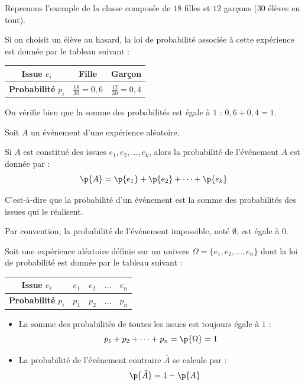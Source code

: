 \begin{ex}
	Reprenons l'exemple de la classe composée de $18$ filles et $12$ garçons ($30$ élèves en tout).

	Si on choisit un élève au hasard, la loi de probabilité associée à cette expérience est donnée par le tableau suivant :

	\begin{center}
		\begin{tabular}{|c|c|c|} \hline
			\textbf{Issue} $e_i$       & Fille                   & Garçon                  \\ \hline
			\textbf{Probabilité} $p_i$ & $\frac{18}{30} = 0{,}6$ & $\frac{12}{30} = 0{,}4$ \\ \hline
		\end{tabular}
	\end{center}

	On vérifie bien que la somme des probabilités est égale à $1$ : $0{,}6 + 0{,}4 = 1$.
\end{ex}

\begin{prop}
	Soit $A$ un événement d'une expérience aléatoire.

	Si $A$ est constitué des issues $e_1, e_2, \dots, e_k$, alors la probabilité de l'événement $A$ est donnée par :
	\[
		\p{A} = \p{e_1} + \p{e_2} + \dots + \p{e_k}
	\]

	C'est-à-dire que la probabilité d'un événement est la somme des probabilités des issues qui le réalisent.
\end{prop}

\begin{rem}
	Par convention, la probabilité de l'événement impossible, noté $\emptyset$, est égale à $0$.
\end{rem}

\begin{prop}
	Soit une expérience aléatoire définie sur un univers $\Omega = \{e_1, e_2, \dots, e_n\}$ dont la loi de probabilité est donnée par le tableau suivant :

	\begin{center}
		\begin{tabular}{|c|c|c|c|c|} \hline
			\textbf{Issue} $e_i$       & $e_1$ & $e_2$ & $\dots$ & $e_n$ \\ \hline
			\textbf{Probabilité} $p_i$ & $p_1$ & $p_2$ & $\dots$ & $p_n$ \\ \hline
		\end{tabular}
	\end{center}

	\begin{itemize}
		\item La somme des probabilités de toutes les issues est toujours égale à $1$ :
		      \[
			      p_1 + p_2 + \dots + p_n = \p{\Omega} = 1
		      \]

		\item La probabilité de l'événement contraire $\bar{A}$ se calcule par :
		      \[
			      \quad \p{\bar{A}} = 1 - \p{A}
		      \]
	\end{itemize}
\end{prop}

